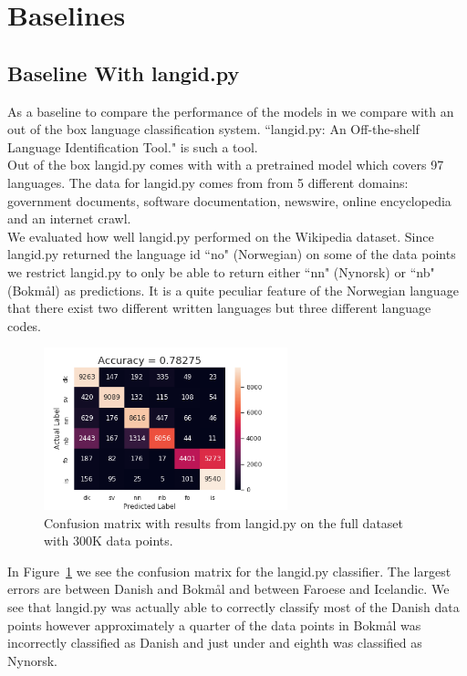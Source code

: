 \section{Baselines}

\subsection{Baseline With langid.py}

As a baseline to compare the performance of the models in we compare with an out of the box language classification system. ``langid.py: An Off-the-shelf Language Identification Tool." \cite{langID} is such a tool.\\

Out of the box langid.py comes with with a pretrained model which covers 97 languages. The data for langid.py comes from from 5 different domains: government documents, software documentation, newswire, online encyclopedia and an internet crawl.\\

We evaluated how well langid.py performed on the Wikipedia dataset. Since langid.py returned the language id ``no" (Norwegian) on some of the data points we restrict langid.py to only be able to return either ``nn" (Nynorsk) or ``nb" (Bokmål) as predictions. It is a quite peculiar feature of the Norwegian language that there exist two different written languages but three different language codes.\\

\begin{figure}[h!]
  \centering
  \includegraphics[width = 200pt]{figs/langid}
  \caption{Confusion matrix with results from langid.py on the full dataset with 300K data points. }
  \label{langid_confusion_matrix}
\end{figure}

In Figure~\ref{langid_confusion_matrix} we see the confusion matrix for the langid.py classifier. The largest errors are between Danish and Bokmål and between Faroese and Icelandic. We see that langid.py was actually able to correctly classify most of the Danish data points however approximately a quarter of the data points in Bokmål was incorrectly classified as Danish and just under and eighth was classified as Nynorsk.\\

